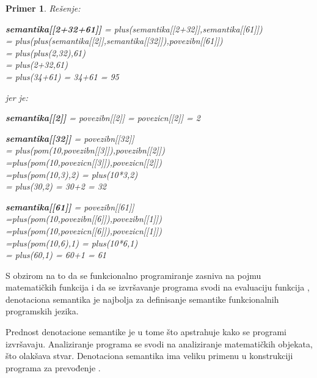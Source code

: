 \documentclass[a4paper]{article}
\newtheorem{primer}{Primer}[section]
\begin{document}
{\begin{primer}
Rešenje:
\begin{center}
\textbf{semantika[[2+32+61]]} = plus(semantika[[2+32]],semantika[[61]])\\
= plus(plus(semantika[[2]],semantika[[32]]),povezibn[[61]])\\
= plus(plus(2,32),61)\\
= plus(2+32,61)\\
= plus(34+61) = 34+61 = 95
\end{center}

jer je:

\begin{center}
\textbf{semantika[[2]]} = povezibn[[2]] = povezicn[[2]] = 2
\end{center}
\begin{center}
\textbf{semantika[[32]]} = povezibn[[32]]\\
= plus(pom(10,povezibn[[3]]),povezibn[[2]])\\
=plus(pom(10,povezicn[[3]]),povezicn[[2]]) \\
=plus(pom(10,3),2) = plus(10*3,2)\\
= plus(30,2) = 30+2 = 32\end{center}

\begin{center}
\textbf{semantika[[61]]} = povezibn[[61]] \\
=plus(pom(10,povezibn[[6]]),povezibn[[1]])\\
=plus(pom(10,povezicn[[6]]),povezicn[[1]]) \\
=plus(pom(10,6),1) = plus(10*6,1)\\
= plus(60,1) = 60+1 = 61

\end{center}
\end{primer}

S obzirom na to da se funkcionalno programiranje zasniva na pojmu matematičkih funkcija i da se izvršavanje programa svodi na evaluaciju funkcija \cite{milena2}, denotaciona semantika je najbolja za definisanje semantike funkcionalnih programskih jezika.


 Prednost denotacione semantike je u tome što apstrahuje kako se programi izvršavaju. Analiziranje programa se svodi na analiziranje matematičkih objekata, što olakšava stvar. Denotaciona semantika ima veliku primenu u konstrukciji programa za prevođenje \cite{parezanovic}.

}
\end{document}
